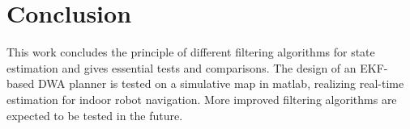 \documentclass[conference]{IEEEtran}
\begin{document}
	\section{Conclusion}
	
	This work concludes the principle of different filtering algorithms for state estimation and gives essential tests and comparisons. The design of an EKF-based DWA planner is tested on a simulative map in matlab, realizing real-time estimation for indoor robot navigation. More improved filtering algorithms are expected to be tested in the future.

%	
%	
%	
	


	
	
	{}	
	
\end{document}
